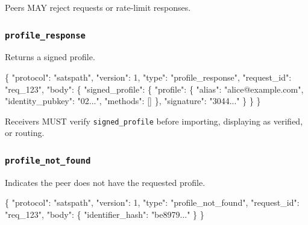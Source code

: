 \documentclass[
]{article}
\newenvironment{Shaded}{}{}
\newcommand{\DataTypeTok}[1]{\textcolor[rgb]{0.56,0.13,0.00}{#1}}
\newcommand{\DecValTok}[1]{\textcolor[rgb]{0.25,0.63,0.44}{#1}}
\newcommand{\FunctionTok}[1]{\textcolor[rgb]{0.02,0.16,0.49}{#1}}
\newcommand{\OtherTok}[1]{\textcolor[rgb]{0.00,0.44,0.13}{#1}}
\newcommand{\StringTok}[1]{\textcolor[rgb]{0.25,0.44,0.63}{#1}}
\begin{document}
Peers MAY reject requests or rate-limit responses.

\hypertarget{profile_response}{%
\subsubsection{\texorpdfstring{\texttt{profile\_response}}{profile\_response}}\label{profile_response}}

Returns a signed profile.

\begin{Shaded}
\begin{Highlighting}[]
\FunctionTok{\{}
  \DataTypeTok{"protocol"}\FunctionTok{:} \StringTok{"satspath"}\FunctionTok{,}
  \DataTypeTok{"version"}\FunctionTok{:} \DecValTok{1}\FunctionTok{,}
  \DataTypeTok{"type"}\FunctionTok{:} \StringTok{"profile\_response"}\FunctionTok{,}
  \DataTypeTok{"request\_id"}\FunctionTok{:} \StringTok{"req\_123"}\FunctionTok{,}
  \DataTypeTok{"body"}\FunctionTok{:} \FunctionTok{\{}
    \DataTypeTok{"signed\_profile"}\FunctionTok{:} \FunctionTok{\{}
      \DataTypeTok{"profile"}\FunctionTok{:} \FunctionTok{\{}
        \DataTypeTok{"alias"}\FunctionTok{:} \StringTok{"alice@example.com"}\FunctionTok{,}
        \DataTypeTok{"identity\_pubkey"}\FunctionTok{:} \StringTok{"02..."}\FunctionTok{,}
        \DataTypeTok{"methods"}\FunctionTok{:} \OtherTok{[]}
      \FunctionTok{\},}
      \DataTypeTok{"signature"}\FunctionTok{:} \StringTok{"3044..."}
    \FunctionTok{\}}
  \FunctionTok{\}}
\FunctionTok{\}}
\end{Highlighting}
\end{Shaded}

Receivers MUST verify \texttt{signed\_profile} before importing,
displaying as verified, or routing.

\hypertarget{profile_not_found}{%
\subsubsection{\texorpdfstring{\texttt{profile\_not\_found}}{profile\_not\_found}}\label{profile_not_found}}

Indicates the peer does not have the requested profile.

\begin{Shaded}
\begin{Highlighting}[]
\FunctionTok{\{}
  \DataTypeTok{"protocol"}\FunctionTok{:} \StringTok{"satspath"}\FunctionTok{,}
  \DataTypeTok{"version"}\FunctionTok{:} \DecValTok{1}\FunctionTok{,}
  \DataTypeTok{"type"}\FunctionTok{:} \StringTok{"profile\_not\_found"}\FunctionTok{,}
  \DataTypeTok{"request\_id"}\FunctionTok{:} \StringTok{"req\_123"}\FunctionTok{,}
  \DataTypeTok{"body"}\FunctionTok{:} \FunctionTok{\{}
    \DataTypeTok{"identifier\_hash"}\FunctionTok{:} \StringTok{"be8979..."}
  \FunctionTok{\}}
\FunctionTok{\}}
\end{Highlighting}
\end{Shaded}
\end{document}
